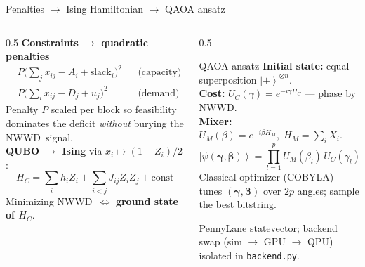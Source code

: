 \documentclass[aspectratio=169,10pt]{beamer}
\newcommand{\ket}[1]{\left|#1\right\rangle}
\newcommand{\NWWD}{\ensuremath{\mathrm{NWWD}}}
\newcommand{\hlt}[1]{{\color{cyan}\bfseries #1}}
\begin{document}
\begin{frame}{Penalties $\to$ Ising Hamiltonian $\to$ QAOA ansatz}
\begin{columns}[T]
\begin{column}{0.5\textwidth}
\textbf{Constraints $\to$ quadratic penalties}
{\footnotesize
\begin{align*}
&P\big(\textstyle\sum_j x_{ij}-A_i+\text{slack}_i\big)^2 &&\text{(capacity)}\\
&P\big(\textstyle\sum_i x_{ij}-D_j+u_j\big)^2 &&\text{(demand)}
\end{align*}}
Penalty $P$ scaled per block so feasibility dominates the deficit \emph{without}
burying the \NWWD\ signal.\\[6pt]

\textbf{QUBO $\to$ Ising} via $x_i\mapsto (1-Z_i)/2$:
\[ H_C = \sum_i h_i Z_i + \sum_{i<j} J_{ij} Z_i Z_j + \text{const} \]
Minimizing \NWWD\ $\Leftrightarrow$ \hlt{ground state of $H_C$}.
\end{column}

\begin{column}{0.5\textwidth}
\begin{block}{QAOA ansatz}
{\footnotesize
\textbf{Initial state:} equal superposition $\ket{+}^{\otimes n}$.\\[3pt]
\textbf{Cost:} $U_C(\gamma)=e^{-i\gamma H_C}$ — phase by \NWWD.\\[3pt]
\textbf{Mixer:} $U_M(\beta)=e^{-i\beta H_M},\; H_M=\sum_i X_i$.}
\[ \ket{\psi(\boldsymbol\gamma,\boldsymbol\beta)}=\prod_{l=1}^{p} U_M(\beta_l)\,U_C(\gamma_l)\,\ket{+}^{\otimes n} \]
{\footnotesize Classical optimizer (COBYLA) tunes $(\boldsymbol\gamma,\boldsymbol\beta)$ over $2p$ angles; sample the best bitstring.}
\end{block}
\vspace{1pt}
{\scriptsize\color{greytx} PennyLane statevector; backend swap (sim $\to$ GPU $\to$ QPU) isolated in \texttt{backend.py}.}
\end{column}
\end{columns}
\end{frame}
\end{document}

